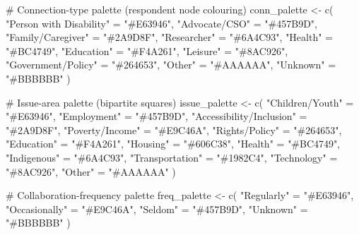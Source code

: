 \documentclass[
  letterpaper,
  DIV=11,
  numbers=noendperiod]{scrartcl}
\newenvironment{Shaded}{\begin{snugshade}}{\end{snugshade}}
\newcommand{\CommentTok}[1]{\textcolor[rgb]{0.37,0.37,0.37}{#1}}
\newcommand{\FunctionTok}[1]{\textcolor[rgb]{0.28,0.35,0.67}{#1}}
\newcommand{\NormalTok}[1]{\textcolor[rgb]{0.00,0.23,0.31}{#1}}
\newcommand{\OtherTok}[1]{\textcolor[rgb]{0.00,0.23,0.31}{#1}}
\newcommand{\StringTok}[1]{\textcolor[rgb]{0.13,0.47,0.30}{#1}}
\begin{document}
\begin{Shaded}
\begin{Highlighting}[]
\CommentTok{\# Connection{-}type palette (respondent node colouring)}
\NormalTok{conn\_palette }\OtherTok{\textless{}{-}} \FunctionTok{c}\NormalTok{(}
  \StringTok{"Person with Disability"} \OtherTok{=} \StringTok{"\#E63946"}\NormalTok{,}
  \StringTok{"Advocate/CSO"}           \OtherTok{=} \StringTok{"\#457B9D"}\NormalTok{,}
  \StringTok{"Family/Caregiver"}       \OtherTok{=} \StringTok{"\#2A9D8F"}\NormalTok{,}
  \StringTok{"Researcher"}             \OtherTok{=} \StringTok{"\#6A4C93"}\NormalTok{,}
  \StringTok{"Health"}                 \OtherTok{=} \StringTok{"\#BC4749"}\NormalTok{,}
  \StringTok{"Education"}              \OtherTok{=} \StringTok{"\#F4A261"}\NormalTok{,}
  \StringTok{"Leisure"}                \OtherTok{=} \StringTok{"\#8AC926"}\NormalTok{,}
  \StringTok{"Government/Policy"}      \OtherTok{=} \StringTok{"\#264653"}\NormalTok{,}
  \StringTok{"Other"}                  \OtherTok{=} \StringTok{"\#AAAAAA"}\NormalTok{,}
  \StringTok{"Unknown"}                \OtherTok{=} \StringTok{"\#BBBBBB"}
\NormalTok{)}

\CommentTok{\# Issue{-}area palette (bipartite squares)}
\NormalTok{issue\_palette }\OtherTok{\textless{}{-}} \FunctionTok{c}\NormalTok{(}
  \StringTok{"Children/Youth"}          \OtherTok{=} \StringTok{"\#E63946"}\NormalTok{,}
  \StringTok{"Employment"}              \OtherTok{=} \StringTok{"\#457B9D"}\NormalTok{,}
  \StringTok{"Accessibility/Inclusion"} \OtherTok{=} \StringTok{"\#2A9D8F"}\NormalTok{,}
  \StringTok{"Poverty/Income"}          \OtherTok{=} \StringTok{"\#E9C46A"}\NormalTok{,}
  \StringTok{"Rights/Policy"}           \OtherTok{=} \StringTok{"\#264653"}\NormalTok{,}
  \StringTok{"Education"}               \OtherTok{=} \StringTok{"\#F4A261"}\NormalTok{,}
  \StringTok{"Housing"}                 \OtherTok{=} \StringTok{"\#606C38"}\NormalTok{,}
  \StringTok{"Health"}                  \OtherTok{=} \StringTok{"\#BC4749"}\NormalTok{,}
  \StringTok{"Indigenous"}              \OtherTok{=} \StringTok{"\#6A4C93"}\NormalTok{,}
  \StringTok{"Transportation"}          \OtherTok{=} \StringTok{"\#1982C4"}\NormalTok{,}
  \StringTok{"Technology"}              \OtherTok{=} \StringTok{"\#8AC926"}\NormalTok{,}
  \StringTok{"Other"}                   \OtherTok{=} \StringTok{"\#AAAAAA"}
\NormalTok{)}

\CommentTok{\# Collaboration{-}frequency palette}
\NormalTok{freq\_palette }\OtherTok{\textless{}{-}} \FunctionTok{c}\NormalTok{(}
  \StringTok{"Regularly"}    \OtherTok{=} \StringTok{"\#E63946"}\NormalTok{,}
  \StringTok{"Occasionally"} \OtherTok{=} \StringTok{"\#E9C46A"}\NormalTok{,}
  \StringTok{"Seldom"}       \OtherTok{=} \StringTok{"\#457B9D"}\NormalTok{,}
  \StringTok{"Unknown"}      \OtherTok{=} \StringTok{"\#BBBBBB"}
\NormalTok{)}
\end{Highlighting}
\end{Shaded}
\end{document}
